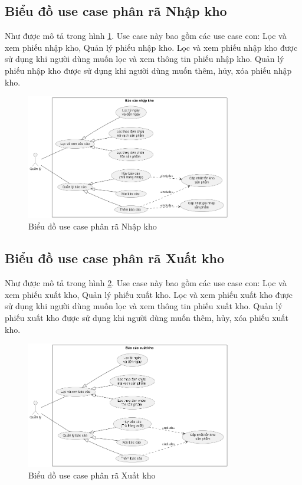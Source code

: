 \documentclass[../DoAn.tex]{subfiles}
\begin{document}
\subsection{Biểu đồ use case phân rã Nhập kho}
\label{subsection:uc-importreport}
Như được mô tả trong hình \ref{fig:uc-importreport}. Use case này bao gồm các use case con: Lọc và xem phiếu nhập kho, Quản lý phiếu nhập kho. Lọc và xem phiếu nhập kho được sử dụng khi người dùng muốn lọc và xem thông tin phiếu nhập kho. Quản lý phiếu nhập kho được sử dụng khi người dùng muốn thêm, hủy, xóa phiếu nhập kho.

\begin{figure}[H]
    \centering
    \includegraphics[width=0.8\textwidth]{Hinhve/usecases/ImportReport}
    \caption{Biểu đồ use case phân rã Nhập kho}
    \label{fig:uc-importreport}
\end{figure}


\subsection{Biểu đồ use case phân rã Xuất kho}
\label{subsection:uc-exportreport}
Như được mô tả trong hình \ref{fig:uc-exportreport}. Use case này bao gồm các use case con: Lọc và xem phiếu xuất kho, Quản lý phiếu xuất kho. Lọc và xem phiếu xuất kho được sử dụng khi người dùng muốn lọc và xem thông tin phiếu xuất kho. Quản lý phiếu xuất kho được sử dụng khi người dùng muốn thêm, hủy, xóa phiếu xuất kho.

\begin{figure}[H]
    \centering
    \includegraphics[width=0.8\textwidth]{Hinhve/usecases/ExportReport}
    \caption{Biểu đồ use case phân rã Xuất kho}
    \label{fig:uc-exportreport}
\end{figure}
\end{document}
